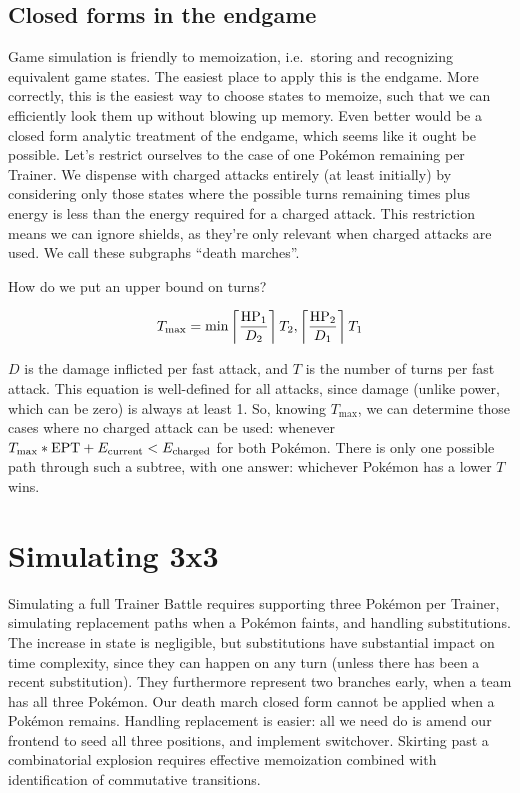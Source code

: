 \subsection{Closed forms in the endgame\label{subsec:endgame}}
Game simulation is friendly to memoization, i.e.\ storing and recognizing equivalent game states.
The easiest place to apply this is the endgame.
More correctly, this is the easiest way to choose states to memoize,
  such that we can efficiently look them up without blowing up memory.
Even better would be a closed form analytic treatment of the endgame,
  which seems like it ought be possible.
Let's restrict ourselves to the case of one Pokémon remaining per Trainer.
We dispense with charged attacks entirely (at least initially) by considering
  only those states where the possible turns remaining times \EPT{} plus
  energy is less than the energy required for a charged attack.
This restriction means we can ignore shields, as they're only relevant
  when charged attacks are used.
We call these subgraphs ``death marches''.

How do we put an upper bound on turns?

\[ T_\mathrm{max} = \min \left\lceil\frac{\mbox{$\mathrm{HP}$}_1}{D_2}\right\rceil T_2,\left\lceil\frac{\mbox{$\mathrm{HP}$}_2}{D_1}\right\rceil T_1 \]

$D$ is the damage inflicted per fast attack, and $T$ is the number of turns per fast attack.
This equation is well-defined for all attacks, since damage (unlike power,
  which can be zero) is always at least 1.
So, knowing $T_\mathrm{max}$, we can determine those cases where no charged attack
  can be used: whenever $T_\mathrm{max} * \mathit{\mbox{$\mathrm{EPT}$}{}} + E_\mathrm{current} < E_\mathrm{charged}$ for both Pokémon.
There is only one possible path through such a subtree, with one answer:
  whichever Pokémon has a lower $T$ wins.

\section{Simulating 3x3\label{sec:simul3x3}}
Simulating a full Trainer Battle requires supporting three Pokémon per Trainer,
  simulating replacement paths when a Pokémon faints,
  and handling substitutions.
The increase in state is negligible, but substitutions have substantial impact on time complexity,
  since they can happen on any turn (unless there has been a recent substitution).
They furthermore represent two branches early, when a team has all three Pokémon.
Our death march closed form cannot be applied when a Pokémon remains.
Handling replacement is easier: all we need do is amend our frontend to
  seed all three positions, and implement switchover.
Skirting past a combinatorial explosion requires effective memoization combined with
 identification of commutative transitions.

